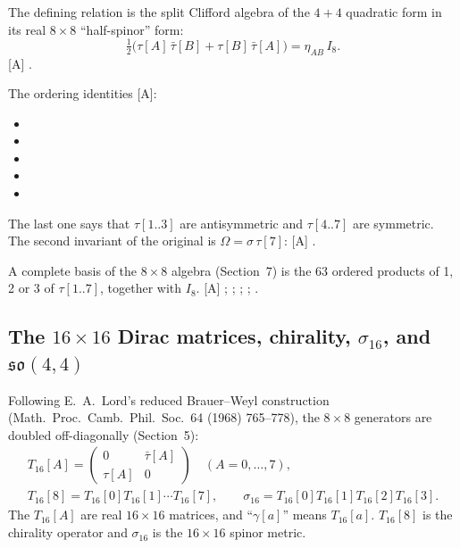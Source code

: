The defining relation is the split Clifford algebra of the $4+4$ quadratic form in its real
$8\times8$ ``half-spinor'' form:
\begin{equation}
  \tfrac12\bigl(\tau[A]\,\bar\tau[B] + \tau[B]\,\bar\tau[A]\bigr) = \eta_{AB}\,I_8 .
\end{equation}
[A] .

The ordering identities [A]:
\begin{itemize}
  \item {}
  \item {}
  \item {}
  \item {}
  \item {}
\end{itemize}
The last one says that $\tau[1..3]$ are antisymmetric and $\tau[4..7]$ are symmetric. The second
invariant of the original is $\Omega=\sigma\,\tau[7]$: [A] .

A complete basis of the $8\times8$ algebra (Section~7) is the 63 ordered products of 1, 2 or 3 of
$\tau[1..7]$, together with $I_8$. [A] ;
; ;
;
.

\subsection{The \texorpdfstring{$16\times16$}{16x16} Dirac matrices, chirality, \texorpdfstring{$\sigma_{16}$}{sigma16}, and \texorpdfstring{$\mathfrak{so}(4,4)$}{so(4,4)}}
\label{fnd:T16}\label{sec:2.5}

Following E.~A.~Lord's reduced Brauer--Weyl construction (Math.\ Proc.\ Camb.\ Phil.\ Soc.\ 64
(1968) 765--778), the $8\times8$ generators are doubled off-diagonally (Section~5):
\begin{gather}
  T_{16}[A] = \begin{pmatrix} 0 & \bar\tau[A]\\ \tau[A] & 0\end{pmatrix}\quad (A=0,\dots,7),\\
  T_{16}[8] = T_{16}[0]T_{16}[1]\cdots T_{16}[7],\qquad
  \sigma_{16} = T_{16}[0]T_{16}[1]T_{16}[2]T_{16}[3].
\end{gather}
The $T_{16}[A]$ are real $16\times16$ matrices, and ``$\gamma[a]$'' means $T_{16}[a]$. $T_{16}[8]$
is the chirality operator and $\sigma_{16}$ is the $16\times16$ spinor metric.

